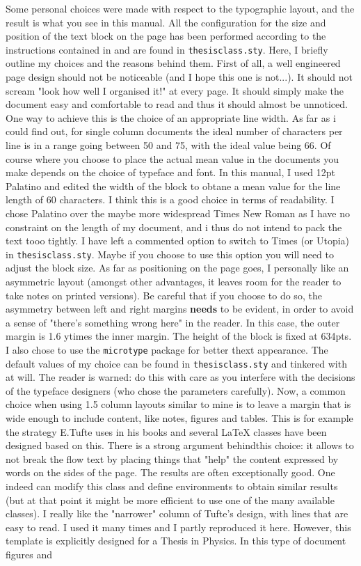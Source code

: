 Some personal choices were made with respect to the typographic layout, and the result is what you see in this manual. All the configuration for the size and position of the text block on the page has been performed according to the instructions contained in \cite{memoirman} and are found in \texttt{thesisclass.sty}. Here, I briefly outline my choices and the reasons behind them. First of all, a well engineered page design should not be noticeable (and I hope this one is not...). It should not scream "look how well I organised it!" at every page. It should simply make the document easy and comfortable to read and thus it should almost be unnoticed. One way to achieve this is the choice of an appropriate line width. As far as i could find out, for single column documents the ideal number of characters per line is in a range going between 50 and 75, with the ideal value being 66. Of course where you choose to place the actual mean value in the documents you make depends on the choice of typeface and font. In this manual, I used 12pt Palatino and edited the width of the block to obtane a mean value for the line length of 60 characters. I think this is a good choice in terms of readability. I chose Palatino over the maybe more widespread Times New Roman as I have no constraint on the length of my document, and i thus do not intend to pack the text tooo tightly. I have left a commented option to switch to Times (or Utopia) in \texttt{thesisclass.sty}. Maybe if you choose to use this option you will need to adjust the block size. As far as positioning on the page goes, I personally like an asymmetric layout (amongst other advantages, it leaves room for the reader to take notes on printed versions). Be careful that if you choose to do so, the asymmetry between left and right margins \textbf{needs} to be evident, in order to avoid a sense of "there's something wrong here" in the reader. In this case, the outer margin is 1.6 ytimes the inner margin. The height of the block is fixed at 634pts. I also chose to use the \texttt{microtype} package for better thext appearance. The default values of my choice can be found in \texttt{thesisclass.sty} and tinkered with at will. The reader is warned: do this with care as you interfere with the decisions of the typeface designers (who chose the parameters carefully). Now, a common choice when using 1.5 column layouts similar to mine is to leave a margin that is wide enough to include content, like notes, figures and tables. This is for example the strategy E.Tufte uses in his books and several \LaTeX\hspace{2pt} classes have been designed based on this. There is a strong argument behindthis choice: it allows to not break the flow text by placing things that "help" the content expressed by words on the sides of the page. The results are often exceptionally good. One indeed can modify this class and define environments to obtain similar results (but at that point it might be more efficient to use one of the many available classes). I really like the "narrower" column of Tufte's design, with lines that are easy to read. I used it many times and I partly reproduced it here. However, this template is explicitly designed for a Thesis in Physics. In this type of document figures and 
